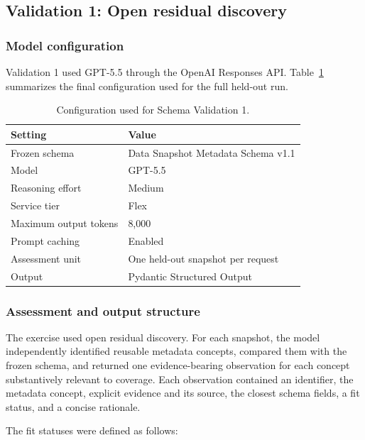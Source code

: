 \documentclass{article}
\begin{document}
\subsection{Validation 1: Open residual discovery}

\subsubsection{Model configuration}

Validation 1 used GPT-5.5 through the OpenAI Responses API. Table~\ref{tab:schema_validation1_configuration} summarizes the final configuration used for the full held-out run.

\begin{table}[!ht]
    \centering
    \caption{Configuration used for Schema Validation 1.}
    \label{tab:schema_validation1_configuration}
    \begin{tabular}{ll}
    \toprule
    \textbf{Setting} & \textbf{Value} \\
    \midrule
    Frozen schema & Data Snapshot Metadata Schema v1.1 \\
    Model & GPT-5.5 \\
    Reasoning effort & Medium \\
    Service tier & Flex \\
    Maximum output tokens & 8,000 \\
    Prompt caching & Enabled \\
    Assessment unit & One held-out snapshot per request \\
    Output & Pydantic Structured Output \\
    \bottomrule
    \end{tabular}
\end{table}

\subsubsection{Assessment and output structure}

The exercise used open residual discovery. For each snapshot, the model independently identified reusable metadata concepts, compared them with the frozen schema, and returned one evidence-bearing observation for each concept substantively relevant to coverage. Each observation contained an identifier, the metadata concept, explicit evidence and its source, the closest schema fields, a fit status, and a concise rationale.

The fit statuses were defined as follows:
\end{document}
